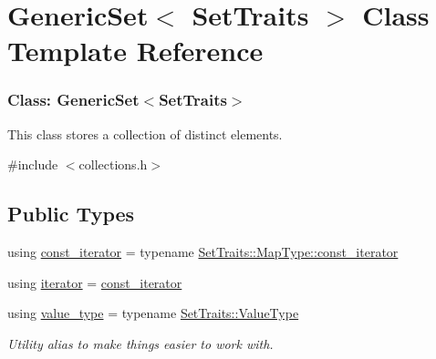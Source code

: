 \hypertarget{classstanfordcpplib_1_1collections_1_1GenericSet}{}\section{Generic\+Set$<$ Set\+Traits $>$ Class Template Reference}
\label{classstanfordcpplib_1_1collections_1_1GenericSet}


\subsubsection*{Class\+: Generic\+Set$<$\+Set\+Traits$>$ }

This class stores a collection of distinct elements.  




{\ttfamily \#include $<$collections.\+h$>$}

\subsection*{Public Types}
\begin{DoxyCompactItemize}
\item 
using \mbox{\hyperlink{classstanfordcpplib_1_1collections_1_1GenericSet_a49eb513fe04e245250a4aebfb1ac768a}{const\+\_\+iterator}} = typename \mbox{\hyperlink{classMap_a04e3b848cce2bbfed5ea818e1b264000}{Set\+Traits\+::\+Map\+Type\+::const\+\_\+iterator}}
\item 
using \mbox{\hyperlink{classstanfordcpplib_1_1collections_1_1GenericSet_ab3d10e70baaeac78e76b7abae7e2cf76}{iterator}} = \mbox{\hyperlink{classstanfordcpplib_1_1collections_1_1GenericSet_a49eb513fe04e245250a4aebfb1ac768a}{const\+\_\+iterator}}
\item 
using \mbox{\hyperlink{classstanfordcpplib_1_1collections_1_1GenericSet_a669c81f158766925e7293f97c0099b28}{value\+\_\+type}} = typename \mbox{\hyperlink{structstanfordcpplib_1_1collections_1_1SetTraits_aecaeabaa9da616ae42bb20787878260d}{Set\+Traits\+::\+Value\+Type}}
\begin{DoxyCompactList}\small\item\em Utility alias to make things easier to work with. \end{DoxyCompactList}\end{DoxyCompactItemize}
